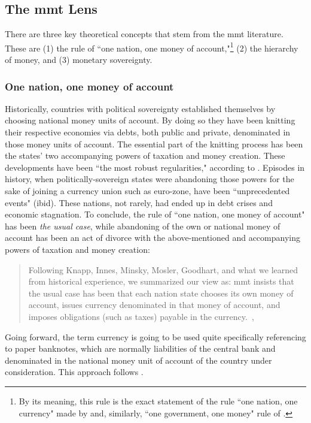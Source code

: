 \subsection{The \ac{mmt} Lens}

There are three key theoretical concepts that stem from the \ac{mmt}
literature. These are (1) the rule of ``one nation, one money of
account,"\footnote{By its meaning, this rule is the exact statement of the rule ``one nation, one currency" made by \citep[pp.~41-42]{wray2012} and, similarly, ``one government, one money" rule of \citep{goodhart2017}.} (2) the hierarchy of money, and (3) monetary sovereignty.

\subsubsection{One nation, one money of account}

Historically, countries with political sovereignty established
themselves by choosing national money units of account. By doing so they
have been knitting their respective economies via debts, both public and
private, denominated in those money units of account. The essential part
of the knitting process has been the states' two accompanying powers of
taxation and money creation. These developments have been ``the most
robust regularities," according to \cite{goodhart2017}. Episodes in history,
when politically-sovereign states were abandoning those powers for the
sake of joining a currency union such as euro-zone, have been
``unprecedented events" (ibid). These nations, not rarely, had ended up
in debt crises and economic stagnation. To conclude, the rule of ``one
nation, one money of account" has been \textit{the usual case}, while
abandoning of the own or national money of account has been an act
of divorce with the above-mentioned and accompanying powers of taxation
and money creation:

\begin{quote}
Following Knapp, Innes, Minsky, Mosler, Goodhart, and what we learned from historical experience, we summarized our view as: \ac{mmt} insists that the usual case has been that each nation state chooses its own money of account, issues currency denominated in that money of account, and imposes obligations (such as taxes) payable in the currency.~\citep[pp.~41-42]{wray2012},~\citep[p.~6]{wray_2020}
\end{quote}

Going forward, the term currency is going to be used quite
specifically referencing to paper banknotes, which are normally
liabilities of the central bank and denominated in the national money
unit of account of the country under consideration. This approach
follows \citep[p.~32]{tymoigne_textbook}.


